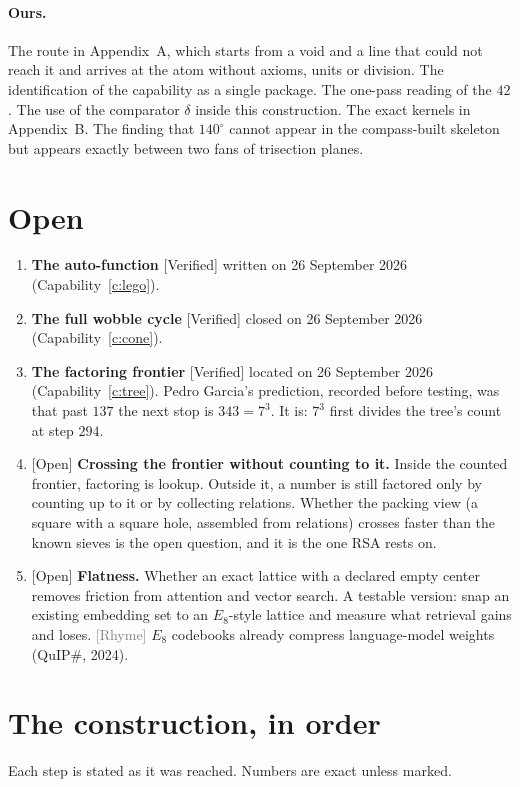 \documentclass[11pt]{article}
\newcommand{\verified}{\textsf{\small\textcolor{verif}{[Verified]}}}
\newcommand{\openitem}{\textsf{\small\textcolor{openc}{[Open]}}}
\newcommand{\rhyme}{\textsf{\small\textcolor{gray}{[Rhyme]}}}
\theoremstyle{definition}\newtheorem{claim}{Capability}
\theoremstyle{remark}
\begin{document}
\paragraph{Ours.}
The route in Appendix~A, which starts from a void and a line that could not reach it and arrives at the atom without axioms, units or division. The identification of the capability as a single package. The one-pass reading of the $42$. The use of the comparator $\delta$ inside this construction. The exact kernels in Appendix~B. The finding that $140^\circ$ cannot appear in the compass-built skeleton but appears exactly between two fans of trisection planes.

\section{Open}
\begin{enumerate}[nosep]
\item \textbf{The auto-function} \verified{} written on 26 September 2026 (Capability~\ref{c:lego}).
\item \textbf{The full wobble cycle} \verified{} closed on 26 September 2026 (Capability~\ref{c:cone}).
\item \textbf{The factoring frontier} \verified{} located on 26 September 2026 (Capability~\ref{c:tree}). Pedro Garcia's prediction, recorded before testing, was that past $137$ the next stop is $343=7^3$. It is: $7^3$ first divides the tree's count at step $294$.
\item \openitem{} \textbf{Crossing the frontier without counting to it.} Inside the counted frontier, factoring is lookup. Outside it, a number is still factored only by counting up to it or by collecting relations. Whether the packing view (a square with a square hole, assembled from relations) crosses faster than the known sieves is the open question, and it is the one RSA rests on.
\item \openitem{} \textbf{Flatness.} Whether an exact lattice with a declared empty center removes friction from attention and vector search. A testable version: snap an existing embedding set to an $E_8$-style lattice and measure what retrieval gains and loses. \rhyme{} $E_8$ codebooks already compress language-model weights (QuIP\#, 2024).
\end{enumerate}

\appendix
\section{The construction, in order}
\small
Each step is stated as it was reached. Numbers are exact unless marked.
\end{document}
